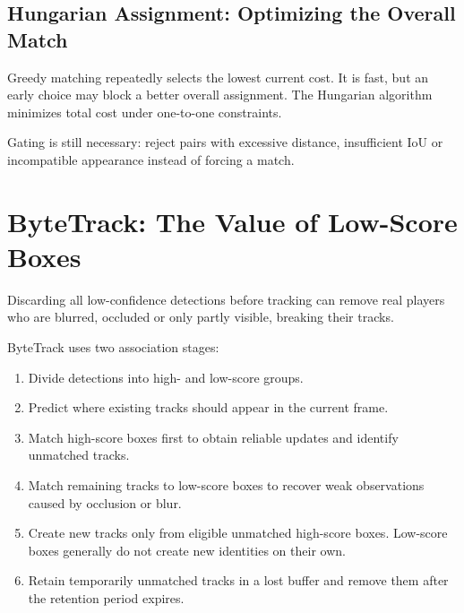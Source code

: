 \documentclass[11pt,a4paper,oneside]{report}
\begin{document}
\subsection{Hungarian Assignment: Optimizing the Overall Match}

Greedy matching repeatedly selects the lowest current cost. It is fast, but an early choice may block a better overall assignment. The Hungarian algorithm minimizes total cost under one-to-one constraints.

Gating is still necessary: reject pairs with excessive distance, insufficient IoU or incompatible appearance instead of forcing a match.

\section{ByteTrack: The Value of Low-Score Boxes}

Discarding all low-confidence detections before tracking can remove real players who are blurred, occluded or only partly visible, breaking their tracks.

ByteTrack uses two association stages:

\begin{plainBox}
\begin{enumerate}[label=\textbf{Step \arabic*:},leftmargin=4.8em,itemsep=.35em]
  \item Divide detections into high- and low-score groups.
  \item Predict where existing tracks should appear in the current frame.
  \item Match high-score boxes first to obtain reliable updates and identify unmatched tracks.
  \item Match remaining tracks to low-score boxes to recover weak observations caused by occlusion or blur.
  \item Create new tracks only from eligible unmatched high-score boxes. Low-score boxes generally do not create new identities on their own.
  \item Retain temporarily unmatched tracks in a lost buffer and remove them after the retention period expires.
\end{enumerate}
\end{plainBox}
\end{document}
